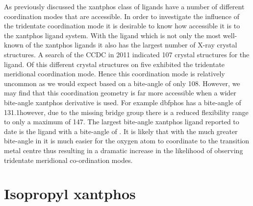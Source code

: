 As previously discussed the xantphos class of ligands have a number of different coordination modes that are accessible.  In order to investigate the influence of the tridentate coordination mode it is desirable to know how accessible it is to the xantphos ligand system.  With the \Phxantphos{} ligand which is not only the most well-known of the xantphos ligands it also has the largest number of X-ray crystal structures.  A search of the CCDC in 2011  indicated 107 crystal structures for the \Phxantphos{} ligand.  Of this different crystal structures on five exhibited the tridentate meridional coordination mode.  Hence this coordination mode is relatively uncommon as we would expect based on a bite-angle of only 108\degrees.  However, we may find that this coordination geometry is far more accessible when a wider bite-angle xantphos derivative is used.  For example dbfphos has a bite-angle of 131.1\degrees however, due to the missing bridge group there is a reduced flexibility range to only a maximum of 147\degrees{}.  The largest bite-angle xantphos ligand reported to date is the \tBuxantphos{} ligand with a bite-angle of \fixme{142\degrees}.  It is likely that with the much greater bite-angle in \tBuxantphos{} it is much easier for the oxygen atom to coordinate to the transition metal centre thus resulting in a dramatic increase in the likelihood of observing tridentate meridional co-ordination modes.  

\section{Isopropyl xantphos}

